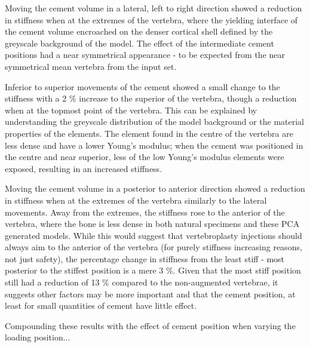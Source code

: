Moving the cement volume in a lateral, left to right direction showed a reduction in stiffness when at the extremes of the vertebra, where the yielding interface of the cement volume encroached on the denser cortical shell defined by the greyscale background of the model.
The effect of the intermediate cement positions had a near symmetrical appearance - to be expected from the near symmetrical mean vertebra from the input set.

Inferior to superior movements of the cement showed a small change to the stiffness with a 2 \% increase to the superior of the vertebra, though a reduction when at the topmost point of the vertebra.
This can be explained by understanding the greyscale distribution of the model background or the material properties of the elements.
The element found in the centre of the vertebra are less dense and have a lower Young's modulus; when the cement was positioned in the centre and near superior, less of the low Young's modulus elements were exposed, resulting in an increased stiffness.

Moving the cement volume in a posterior to anterior direction showed a reduction in stiffness when at the extremes of the vertebra similarly to the lateral movements.
Away from the extremes, the stiffness rose to the anterior of the vertebra, where the bone is less dense in both natural specimens and these PCA generated models.
While this would suggest that vertebroplasty injections should always aim to the anterior of the vertebra (for purely stiffness increasing reasons, not just safety), the percentage change in stiffness from the least stiff - most posterior to the stiffest position is a mere 3 \%.
Given that the most stiff position still had a reduction of 13 \% compared to the non-augmented vertebrae, it suggests other factors may be more important and that the cement position, at least for small quantities of cement have little effect.

Compounding these results with the effect of cement position when varying the loading position...

